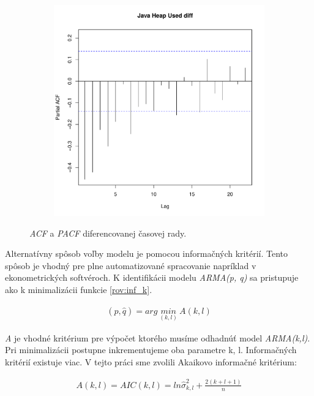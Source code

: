 \documentclass[12pt,a4paper,oneside,final]{article}
\theoremstyle{definition}
\theoremstyle{remark}
\numberwithin{equation}{section}
\begin{document}
\begin{figure}[H]
\begin{subfigure}[b]{0.45\textwidth}
        \includegraphics[width=1\linewidth]{images/heap_diff_pacf.pdf}
    \end{subfigure}
    \caption{\emph{ACF} a \emph{PACF} diferencovanej časovej rady.}
    \label{obr:heap_diff_acf_pacf}
\end{figure}

Alternatívny spôsob voľby modelu je pomocou informačných kritérií. Tento spôsob je
vhodný pre plne automatizované spracovanie \cite{cipra} napríklad v ekonometrických 
softvéroch. K identifikácii modelu \emph{ARMA(p, q)} sa pristupuje ako k minimalizácii funkcie
\ref{rov:inf_k}.

\begin{eqnarray} \label{rov:inf_k}
    (\hat{p}, \hat{q}) =arg\ \underset{(k,l)}{min}\ A(k, l)
\end{eqnarray}

\emph{A} je vhodné kritérium pre výpočet ktorého musíme odhadnúť model
\emph{ARMA(k,l)}. Pri minimalizácii postupne inkrementujeme oba parametre k, l.
Informačných kritérií existuje viac. V tejto práci sme zvolili Akaikovo informačné kritérium:

\begin{eqnarray} \label{rov:aic}
    A(k,l) = AIC(k,l) = ln\hat{\sigma}^{2}_{k,l} + \frac{2(k+l+1)}{n}
\end{eqnarray}
\end{document}
